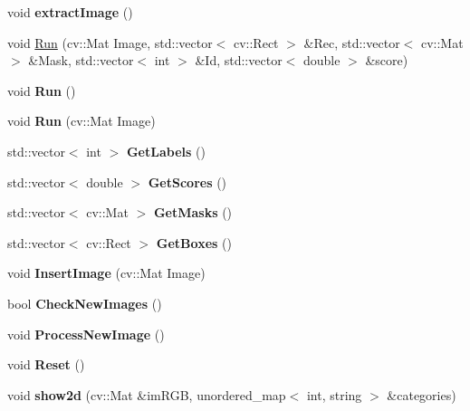 \begin{DoxyCompactItemize}
\item 
\mbox{\label{classMaskRCNN_a76780ee7dc9746a7e636af05a7f9737a}} 
void {\bfseries extract\+Image} ()
\item 
void \hyperlink{classMaskRCNN_a5663b7c0e5e9fd148802735bd7c3f368}{Run} (cv\+::\+Mat Image, std\+::vector$<$ cv\+::\+Rect $>$ \&Rec, std\+::vector$<$ cv\+::\+Mat $>$ \&Mask, std\+::vector$<$ int $>$ \&Id, std\+::vector$<$ double $>$ \&score)
\item 
\mbox{\label{classMaskRCNN_a4db74b63c6d69d8d25302b4cb15c0e55}} 
void {\bfseries Run} ()
\item 
\mbox{\label{classMaskRCNN_a474f94fbb64745662c855712d507a2b1}} 
void {\bfseries Run} (cv\+::\+Mat Image)
\item 
\mbox{\label{classMaskRCNN_a370fc233cd71b9d46ce363ebd905963a}} 
std\+::vector$<$ int $>$ {\bfseries Get\+Labels} ()
\item 
\mbox{\label{classMaskRCNN_ab066b1ae28085d34e05d1565f9a4deab}} 
std\+::vector$<$ double $>$ {\bfseries Get\+Scores} ()
\item 
\mbox{\label{classMaskRCNN_a5d55b8bc70406a9a10ef4499d0ff8e12}} 
std\+::vector$<$ cv\+::\+Mat $>$ {\bfseries Get\+Masks} ()
\item 
\mbox{\label{classMaskRCNN_a27a3a447097c06ba0b22388aa80b798b}} 
std\+::vector$<$ cv\+::\+Rect $>$ {\bfseries Get\+Boxes} ()
\item 
\mbox{\label{classMaskRCNN_a44fae16e8ff69796041f461d428fee98}} 
void {\bfseries Insert\+Image} (cv\+::\+Mat Image)
\item 
\mbox{\label{classMaskRCNN_a083eb72d76b28594cffb274a71eaf7ac}} 
bool {\bfseries Check\+New\+Images} ()
\item 
\mbox{\label{classMaskRCNN_a1f919e35e712e6119f9c38a8ea8f81c0}} 
void {\bfseries Process\+New\+Image} ()
\item 
\mbox{\label{classMaskRCNN_a54b77286554c60d9e0ad01217f701ff1}} 
void {\bfseries Reset} ()
\item 
\mbox{\label{classMaskRCNN_ae2912918796d4ae6a2f2291d181b745b}} 
void {\bfseries show2d} (cv\+::\+Mat \&im\+R\+GB, unordered\+\_\+map$<$ int, string $>$ \&categories)
\end{DoxyCompactItemize}


